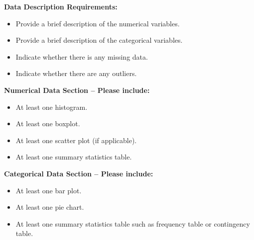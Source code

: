\vspace{6pt}
\noindent \textbf{Data Description Requirements:}
\begin{itemize}
    \item Provide a brief description of the numerical variables.
    \item Provide a brief description of the categorical variables.
    \item Indicate whether there is any missing data.
    \item Indicate whether there are any outliers.
\end{itemize}

\vspace{6pt}
\noindent \textbf{Numerical Data Section – Please include:}
\begin{itemize}
    \item At least one histogram.
    \item At least one boxplot.
    \item At least one scatter plot (if applicable).
    \item At least one summary statistics table.
\end{itemize}

\vspace{6pt}
\noindent \textbf{Categorical Data Section – Please include:}
\begin{itemize}
    \item At least one bar plot.
    \item At least one pie chart.
    \item At least one summary statistics table such as frequency table or contingency table.
\end{itemize}

